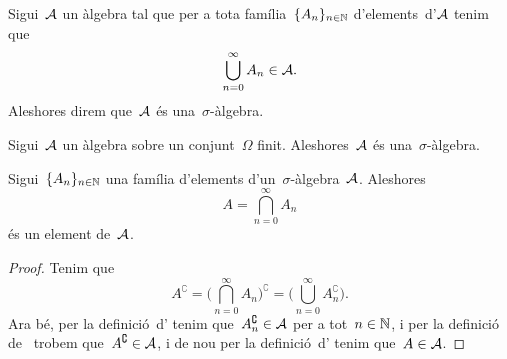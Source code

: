 \documentclass[../../Main.tex]{subfiles}
\begin{document}
	\begin{definition}
		\label{def:sigma àlgebra}
		Sigui~\(\mathcal{A}\) un àlgebra tal que per a tota família~\(\{A_{n}\}_{n\in\mathbb{N}}\) d'elements~d'\(\mathcal{A}\) tenim que
		\[\bigcup_{n=0}^{\infty}A_{n}\in\mathcal{A}.\]
		Aleshores direm que~\(\mathcal{A}\) és una~\(\sigma\)-àlgebra.
	\end{definition}
	\begin{observation}
		Sigui~\(\mathcal{A}\) un àlgebra sobre un conjunt~\(\Omega\) finit. Aleshores~\(\mathcal{A}\) és una~\(\sigma\)-àlgebra.
	\end{observation}
	\begin{proposition}
		\label{prop:les sigma àlgebras són tancades per interseccions numerables}
		Sigui~\(\{A_{n}\}_{n\in\mathbb{N}}\) una família d'elements d'un~\(\sigma\)-àlgebra~\(\mathcal{A}\). Aleshores
		\[A=\bigcap_{n=0}^{\infty}A_{n}\]
		és un element de~\(\mathcal{A}\).
		\begin{proof}
			Tenim que
			\[A^{\complement}=\Big(\bigcap_{n=0}^{\infty}A_{n}\Big)^{\complement}=\Big(\bigcup_{n=0}^{\infty}A_{n}^{\complement}\Big).\]
			Ara bé, per la definició~d' tenim que~\(A_{n}^{\complement}\in\mathcal{A}\) per a tot~\(n\in\mathbb{N}\), i per la definició de~ trobem que~\(A^{\complement}\in\mathcal{A}\), i de nou per la definició~d' tenim que~\(A\in\mathcal{A}\).
		\end{proof}
	\end{proposition}
\end{document}
